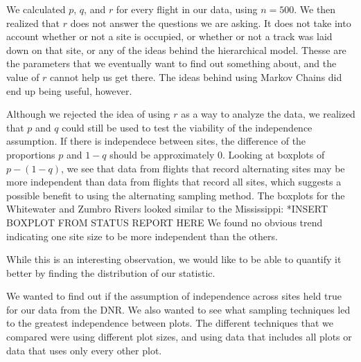 \documentclass{article}
\begin{document}
	We calculated \(p\), \(q\), and \(r\) for every flight in our data, using 
\(n = 500\).  We then realized that \(r\) does not answer the questions we are 
asking.  It does not take into account whether or not a site is occupied, or 
whether or not a track was laid down on that site, or any of the ideas behind the
hierarchical model.  Thesse are the parameters that we eventually want to find 
out something about, and the value of \(r\) cannot help us get there.  The ideas 
behind using Markov Chains did end up being useful, however.  
	
	Although we rejected the idea of using \(r\) as a way to analyze the data, we
realized that \(p\) and \(q\) could still be used to test the viability of the 
independence assumption.  If there is independece between sites, the difference 
of the proportions \(p\) and \(1-q\) should be approximately \(0\).  Looking at 
boxplots of \(p - (1-q)\), we see that data from flights that record alternating 
sites may be more independent than data from flights that record all sites, which
suggests a possible benefit to using the alternating sampling method.  The
boxplots for the Whitewater and Zumbro Rivers looked similar to the Mississippi:
*INSERT BOXPLOT FROM STATUS REPORT HERE
We found no obvious trend indicating one site size to be more independent than 
the others.  

	While this is an interesting observation, we would like to be able to 
quantify it better by finding the distribution of our statistic.   


		We wanted to find out if the assumption of independence across sites held
true for our data from the DNR.  We also wanted to see what sampling techniques 
led to the greatest independence between plots.  The different techniques that we
compared were using different plot sizes, and using data that includes all plots
or data that uses only every other plot. \\
\end{document}
